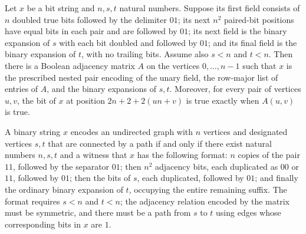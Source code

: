 \begin{lemma}
\label{Complexity.exists_eq_of_ushape}
\leanok
{}
Let $x$ be a bit string and $n,s,t$ natural numbers. Suppose its first field consists of
$n$ doubled true bits followed by the delimiter $01$; its next $n^2$ paired-bit
positions have equal bits in each pair and are followed by $01$; its next field is the
binary expansion of $s$ with each bit doubled and followed by $01$; and its final field
is the binary expansion of $t$, with no trailing bits. Assume also $s<n$ and $t<n$. Then
there is a Boolean adjacency matrix $A$ on the vertices $0,\ldots,n-1$ such that $x$ is
the prescribed nested pair encoding of the unary field, the row-major list of entries of
$A$, and the binary expansions of $s,t$. Moreover, for every pair of vertices $u,v$, the
bit of $x$ at position $2n+2+2(un+v)$ is true exactly when $A(u,v)$ is true.
\end{lemma}

\begin{theorem}
\label{Complexity.mem_UPATH_iff}
\leanok
{}
A binary string $x$ encodes an undirected graph with $n$ vertices and designated
vertices $s,t$ that are connected by a path if and only if there exist natural numbers
$n,s,t$ and a witness that $x$ has the following format: $n$ copies of the pair $11$,
followed by the separator $01$; then $n^2$ adjacency bits, each duplicated as $00$ or
$11$, followed by $01$; then the bits of $s$, each duplicated, followed by $01$; and
finally the ordinary binary expansion of $t$, occupying the entire remaining suffix. The
format requires $s<n$ and $t<n$; the adjacency relation encoded by the matrix must be
symmetric, and there must be a path from $s$ to $t$ using edges whose corresponding bits
in $x$ are $1$.
\end{theorem}
